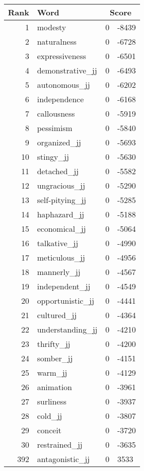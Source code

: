 \begin{longtable}[!htbp]{| rlr@{.}l |}
    \hline
    \textbf{Rank} & \textbf{Word} & \multicolumn{2}{c|}{\textbf{Score}} \\
    \hline
    \endhead
    1 & modesty & 0 & -8439 \\
    2 & naturalness & 0 & -6728 \\
    3 & expressiveness & 0 & -6501 \\
    4 & demonstrative\_jj & 0 & -6493 \\
    5 & autonomous\_jj & 0 & -6202 \\
    6 & independence & 0 & -6168 \\
    7 & callousness & 0 & -5919 \\
    8 & pessimism & 0 & -5840 \\
    9 & organized\_jj & 0 & -5693 \\
    10 & stingy\_jj & 0 & -5630 \\
    11 & detached\_jj & 0 & -5582 \\
    12 & ungracious\_jj & 0 & -5290 \\
    13 & self-pitying\_jj & 0 & -5285 \\
    14 & haphazard\_jj & 0 & -5188 \\
    15 & economical\_jj & 0 & -5064 \\
    16 & talkative\_jj & 0 & -4990 \\
    17 & meticulous\_jj & 0 & -4956 \\
    18 & mannerly\_jj & 0 & -4567 \\
    19 & independent\_jj & 0 & -4549 \\
    20 & opportunistic\_jj & 0 & -4441 \\
    21 & cultured\_jj & 0 & -4364 \\
    22 & understanding\_jj & 0 & -4210 \\
    23 & thrifty\_jj & 0 & -4200 \\
    24 & somber\_jj & 0 & -4151 \\
    25 & warm\_jj & 0 & -4129 \\
    26 & animation & 0 & -3961 \\
    27 & surliness & 0 & -3937 \\
    28 & cold\_jj & 0 & -3807 \\
    29 & conceit & 0 & -3720 \\
    30 & restrained\_jj & 0 & -3635 \\
    392 & antagonistic\_jj & 0 & 3533 \\

\end{longtable}
